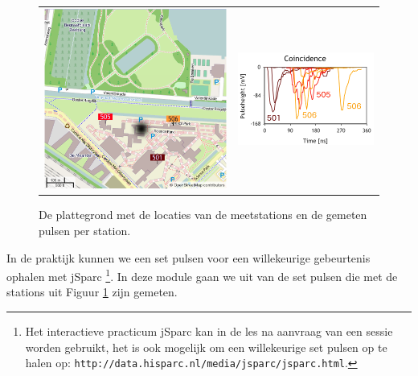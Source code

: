 \begin{figure}[h]
\noindent \begin{centering}
\begin{tabular}{cc}
\includegraphics[scale=0.33]{Figures/kaart} & \includegraphics[scale=0.65]{Figures/Coincidence}\tabularnewline
\end{tabular}
\par\end{centering}

\caption{\label{fig:coincidence}De plattegrond met de locaties van de meetstations
en de gemeten pulsen per station.}
\end{figure}


In de praktijk kunnen we een set pulsen voor een willekeurige gebeurtenis
ophalen met jSparc%
\footnote{Het interactieve practicum jSparc kan in de les na aanvraag van een
sessie worden gebruikt, het is ook mogelijk om een willekeurige set
pulsen op te halen op: \texttt{http://data.hisparc.nl/media/jsparc/jsparc.html}.%
}. In deze module gaan we uit van de set pulsen die met de stations
uit Figuur \ref{fig:coincidence} zijn gemeten.

